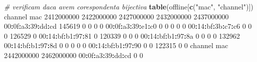\documentclass[]{article}
\newenvironment{Shaded}{\begin{snugshade}}{\end{snugshade}}
\newcommand{\KeywordTok}[1]{\textcolor[rgb]{0.13,0.29,0.53}{\textbf{#1}}}
\newcommand{\DecValTok}[1]{\textcolor[rgb]{0.00,0.00,0.81}{#1}}
\newcommand{\StringTok}[1]{\textcolor[rgb]{0.31,0.60,0.02}{#1}}
\newcommand{\CommentTok}[1]{\textcolor[rgb]{0.56,0.35,0.01}{\textit{#1}}}
\newcommand{\OperatorTok}[1]{\textcolor[rgb]{0.81,0.36,0.00}{\textbf{#1}}}
\newcommand{\NormalTok}[1]{#1}
\begin{document}
\begin{Shaded}
\begin{Highlighting}[]
{\CommentTok{# verificam daca avem corespondenta bijectiva}
\KeywordTok{table}\NormalTok{(offline[}\KeywordTok{c}\NormalTok{(}\StringTok{"mac"}\NormalTok{, }\StringTok{"channel"}\NormalTok{)])}
\NormalTok{                   channel}
\NormalTok{mac                 }\DecValTok{2412000000} \DecValTok{2422000000} \DecValTok{2427000000} \DecValTok{2432000000} \DecValTok{2437000000}
  \DecValTok{00}\OperatorTok{:}\NormalTok{0f}\OperatorTok{:}\NormalTok{a3}\OperatorTok{:}\DecValTok{39}\OperatorTok{:}\NormalTok{dd}\OperatorTok{:}\NormalTok{cd     }\DecValTok{145619}          \DecValTok{0}          \DecValTok{0}          \DecValTok{0}          \DecValTok{0}
  \DecValTok{00}\OperatorTok{:}\NormalTok{0f}\OperatorTok{:}\NormalTok{a3}\OperatorTok{:}\DecValTok{39}\OperatorTok{:}\NormalTok{e1}\OperatorTok{:}\NormalTok{c0          }\DecValTok{0}          \DecValTok{0}          \DecValTok{0}          \DecValTok{0}          \DecValTok{0}
  \DecValTok{00}\OperatorTok{:}\DecValTok{14}\OperatorTok{:}\NormalTok{bf}\OperatorTok{:}\NormalTok{3b}\OperatorTok{:}\NormalTok{c7}\OperatorTok{:}\NormalTok{c6          }\DecValTok{0}          \DecValTok{0}          \DecValTok{0}     \DecValTok{126529}          \DecValTok{0}
  \DecValTok{00}\OperatorTok{:}\DecValTok{14}\OperatorTok{:}\NormalTok{bf}\OperatorTok{:}\NormalTok{b1}\OperatorTok{:}\DecValTok{97}\OperatorTok{:}\DecValTok{81}          \DecValTok{0}     \DecValTok{120339}          \DecValTok{0}          \DecValTok{0}          \DecValTok{0}
  \DecValTok{00}\OperatorTok{:}\DecValTok{14}\OperatorTok{:}\NormalTok{bf}\OperatorTok{:}\NormalTok{b1}\OperatorTok{:}\DecValTok{97}\OperatorTok{:}\NormalTok{8a          }\DecValTok{0}          \DecValTok{0}          \DecValTok{0}          \DecValTok{0}     \DecValTok{132962}
  \DecValTok{00}\OperatorTok{:}\DecValTok{14}\OperatorTok{:}\NormalTok{bf}\OperatorTok{:}\NormalTok{b1}\OperatorTok{:}\DecValTok{97}\OperatorTok{:}\NormalTok{8d          }\DecValTok{0}          \DecValTok{0}          \DecValTok{0}          \DecValTok{0}          \DecValTok{0}
  \DecValTok{00}\OperatorTok{:}\DecValTok{14}\OperatorTok{:}\NormalTok{bf}\OperatorTok{:}\NormalTok{b1}\OperatorTok{:}\DecValTok{97}\OperatorTok{:}\DecValTok{90}          \DecValTok{0}          \DecValTok{0}     \DecValTok{122315}          \DecValTok{0}          \DecValTok{0}
\NormalTok{                   channel}
\NormalTok{mac                 }\DecValTok{2442000000} \DecValTok{2462000000}
  \DecValTok{00}\OperatorTok{:}\NormalTok{0f}\OperatorTok{:}\NormalTok{a3}\OperatorTok{:}\DecValTok{39}\OperatorTok{:}\NormalTok{dd}\OperatorTok{:}\NormalTok{cd          }\DecValTok{0}          \DecValTok{0}
}
\end{Highlighting}
\end{Shaded}
\end{document}
